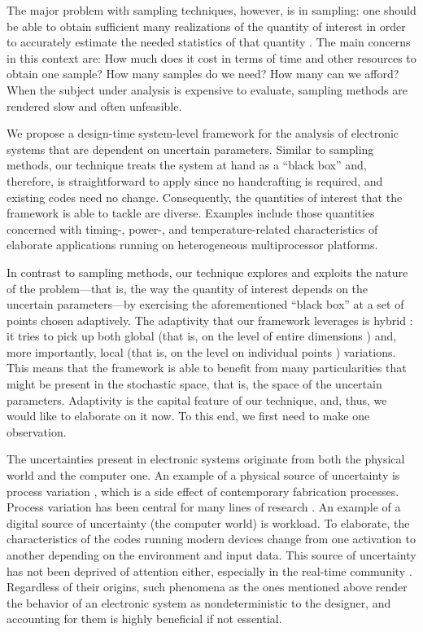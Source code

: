 The major problem with sampling techniques, however, is in sampling: one should
be able to obtain sufficient many realizations of the quantity of interest in
order to accurately estimate the needed statistics of that quantity
\cite{diaz-emparanza2002}. The main concerns in this context are: How much does
it cost in terms of time and other resources to obtain one sample? How many
samples do we need? How many can we afford? When the subject under analysis is
expensive to evaluate, sampling methods are rendered slow and often unfeasible.

We propose a design-time system-level framework for the analysis of electronic
systems that are dependent on uncertain parameters. Similar to sampling methods,
our technique treats the system at hand as a ``black box'' and, therefore, is
straightforward to apply since no handcrafting is required, and existing codes
need no change. Consequently, the quantities of interest that the framework is
able to tackle are diverse. Examples include those quantities concerned with
timing-, power-, and temperature-related characteristics of elaborate
applications running on heterogeneous multiprocessor platforms.

In contrast to sampling methods, our technique explores and exploits the nature
of the problem---that is, the way the quantity of interest depends on the
uncertain parameters---by exercising the aforementioned ``black box'' at a set
of points chosen adaptively. The adaptivity that our framework leverages is
hybrid \cite{jakeman2012}: it tries to pick up both global (that is, on the
level of entire dimensions \cite{klimke2006}) and, more importantly, local (that
is, on the level on individual points \cite{ma2009}) variations. This means that
the framework is able to benefit from many particularities that might be present
in the stochastic space, that is, the space of the uncertain parameters.
Adaptivity is the capital feature of our technique, and, thus, we would like to
elaborate on it now. To this end, we first need to make one observation.

The uncertainties present in electronic systems originate from both the physical
world and the computer one. An example of a physical source of uncertainty is
process variation \cite{srivastava2005}, which is a side effect of contemporary
fabrication processes. Process variation has been central for many lines of
research \cite{bhardwaj2008, juan2012, lee2013, ukhov2014, ukhov2015}. An
example of a digital source of uncertainty (the computer world) is workload. To
elaborate, the characteristics of the codes running modern devices change from
one activation to another depending on the environment and input data. This
source of uncertainty has not been deprived of attention either, especially in
the real-time community \cite{quinton2012, diaz2002, santinelli2011,
tanasa2015}. Regardless of their origins, such phenomena as the ones mentioned
above render the behavior of an electronic system as nondeterministic to the
designer, and accounting for them is highly beneficial if not essential.

